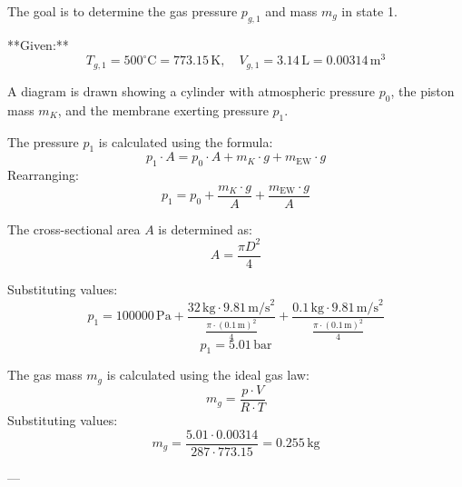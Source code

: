 The goal is to determine the gas pressure \( p_{g,1} \) and mass \( m_g \) in state 1.  

**Given:**  
\[
T_{g,1} = 500^\circ\text{C} = 773.15 \, \text{K}, \quad V_{g,1} = 3.14 \, \text{L} = 0.00314 \, \text{m}^3
\]  

A diagram is drawn showing a cylinder with atmospheric pressure \( p_0 \), the piston mass \( m_K \), and the membrane exerting pressure \( p_1 \).  

The pressure \( p_1 \) is calculated using the formula:  
\[
p_1 \cdot A = p_0 \cdot A + m_K \cdot g + m_{\text{EW}} \cdot g
\]  
Rearranging:  
\[
p_1 = p_0 + \frac{m_K \cdot g}{A} + \frac{m_{\text{EW}} \cdot g}{A}
\]  

The cross-sectional area \( A \) is determined as:  
\[
A = \frac{\pi D^2}{4}
\]  

Substituting values:  
\[
p_1 = 100000 \, \text{Pa} + \frac{32 \, \text{kg} \cdot 9.81 \, \text{m/s}^2}{\frac{\pi \cdot (0.1 \, \text{m})^2}{4}} + \frac{0.1 \, \text{kg} \cdot 9.81 \, \text{m/s}^2}{\frac{\pi \cdot (0.1 \, \text{m})^2}{4}}
\]  
\[
p_1 = 5.01 \, \text{bar}
\]  

The gas mass \( m_g \) is calculated using the ideal gas law:  
\[
m_g = \frac{p \cdot V}{R \cdot T}
\]  
Substituting values:  
\[
m_g = \frac{5.01 \cdot 0.00314}{287 \cdot 773.15} = 0.255 \, \text{kg}
\]  

---